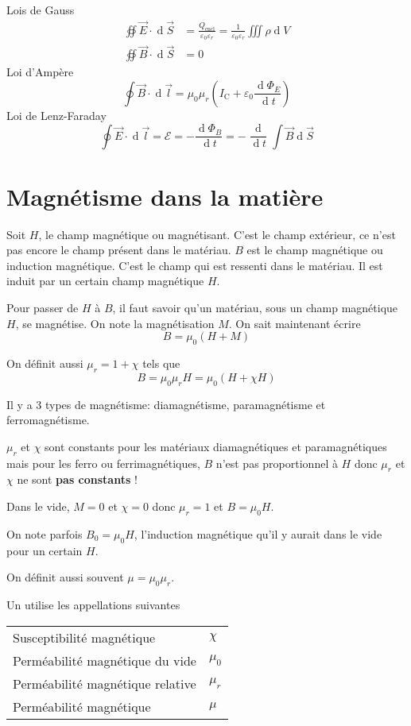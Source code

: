 \documentclass[11pt,a4paper]{article}
\newcommand{\B}{\vec B}
\newcommand{\E}{\vec E}
\newcommand{\EMF}{\mathcal{E}}
\DeclareMathOperator{\diff}{d}
\newcommand{\dif}{\diff\!}
\begin{document}
Lois de Gauss
\begin{align*}
	\oiint \E \cdot \dif \vec S &= \frac{Q_\mathrm{encl}}{\varepsilon_0\varepsilon_r} = \frac{1}{\varepsilon_0\varepsilon_r}\iiint \rho \dif V\\
	\oiint \B \cdot \dif \vec S &= 0
\end{align*}
Loi d'Ampère
\[ \oint \B \cdot \dif \vec l = \mu_0\mu_r \left(I_\mathrm{C} + \varepsilon_0 \frac{\dif \Phi_E}{\dif t}\right) \]%
Loi de Lenz-Faraday
\[ \oint \E \cdot \dif \vec l = \EMF = - \frac{\dif \Phi_B}{\dif t} = - \frac{\dif}{\dif t}\int \B \dif \vec S \]

\part{Magnétisme dans la matière}
Soit $H$, le champ magnétique ou magnétisant.
C'est le champ extérieur, ce n'est pas encore le champ présent dans le matériau.
$B$ est le champ magnétique ou induction magnétique.
C'est le champ qui est ressenti dans le matériau.
Il est induit par un certain champ magnétique $H$.

Pour passer de $H$ à $B$, il faut savoir qu'un matériau, sous un champ magnétique $H$, se magnétise.
On note la magnétisation $M$.
On sait maintenant écrire
\[ B = \mu_0 (H + M) \]

On définit aussi $\mu_r = 1 + \chi$ tels que
\[ B = \mu_0\mu_r H = \mu_0 (H + \chi H) \]

Il y a 3 types de magnétisme: diamagnétisme, paramagnétisme et ferromagnétisme.

$\mu_r$ et $\chi$ sont constants pour les matériaux diamagnétiques et paramagnétiques mais pour les ferro ou ferrimagnétiques, $B$ n'est pas proportionnel à $H$ donc $\mu_r$ et $\chi$ ne sont \textbf{pas constants} !

Dans le vide, $M = 0$ et $\chi = 0$ donc $\mu_r = 1$ et $B = \mu_0 H$.

On note parfois $B_0 = \mu_0 H$, l'induction magnétique qu'il y aurait dans le vide pour un certain $H$.

On définit aussi souvent $\mu = \mu_0 \mu_r$.

Un utilise les appellations suivantes
\begin{center}
	\begin{tabular}{ll}
		Susceptibilité magnétique & $\chi$\\
		Perméabilité magnétique du vide & $\mu_0$\\
		Perméabilité magnétique relative & $\mu_r$\\
		Perméabilité magnétique & $\mu$
	\end{tabular}
\end{center}
\end{document}
